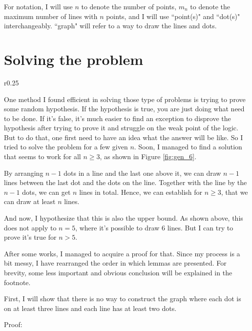 \documentclass[a4paper, 12pt]{article}
\begin{document}
For notation, I will use $n$ to denote the number of points, $m_n$ to denote the maximum number of lines with $n$ points, and I will use ``point(s)" and ``dot(s)" interchangeably. ``graph" will refer to a way to draw the lines and dots.
\clearpage

\section{Solving the problem}
\begin{wrapfigure}{r}{0.25\textwidth}
    
    \caption{general solution with $n=6$}
    \label{fig:gen_6}
\end{wrapfigure}
One method I found efficient in solving those type of problems is trying to prove some random hypothesis. If the hypothesis is true, you are just doing what need to be done. If it's false, it's much easier to find an exception to disprove the hypothesis after trying to prove it and struggle on the weak point of the logic. But to do that, one first need to have an idea what the answer will be like. So I tried to solve the problem for a few given $n$. Soon, I managed to find a solution that seems to work for all $n\geq 3$, as shown in Figure \ref{fig:gen_6}.

By arranging $n-1$ dots in a line and the last one above it, we can draw $n-1$ lines between the last dot and the dots on the line. Together with the line by the $n-1$ dots, we can get $n$ lines in total. Hence, we can establish for $n\geq 3$, that we can draw at least $n$ lines.

And now, I hypothesize that this is also the upper bound. As shown above, this does not apply to $n=5$, where it's possible to draw 6 lines. But I can try to prove it's true for $n>5$.

After some works, I managed to acquire a proof for that. Since my process is a bit messy, I have rearranged the order in which lemmas are presented. For brevity, some less important and obvious conclusion will be explained in the footnote.

First, I will show that there is no way to construct the graph where each dot is on at least three lines and each line has at least two dots.

Proof:
\end{document}

